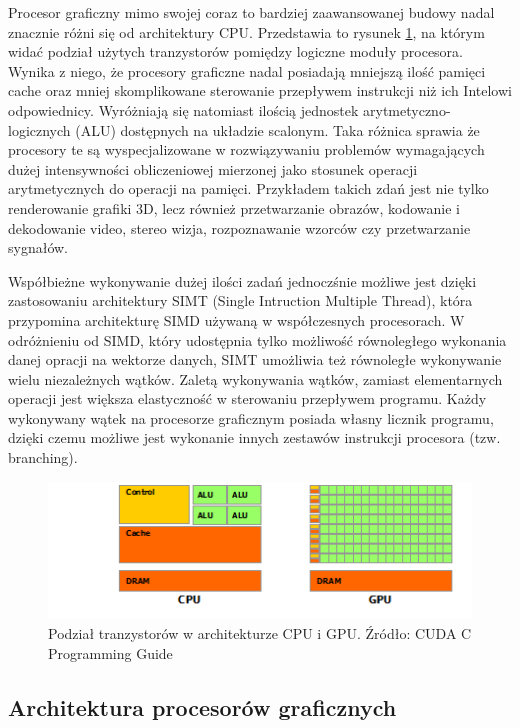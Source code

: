 Procesor graficzny mimo swojej coraz to bardziej zaawansowanej budowy nadal
znacznie różni się od architektury CPU. Przedstawia to rysunek \ref{cpugpu}, na
którym widać podział użytych tranzystorów pomiędzy logiczne moduły procesora.
Wynika z niego, że procesory graficzne nadal posiadają mniejszą ilość pamięci cache oraz
mniej skomplikowane sterowanie przepływem instrukcji niż ich Intelowi
odpowiednicy. Wyróżniają się natomiast ilością jednostek arytmetyczno-logicznych
(ALU) dostępnych na układzie scalonym. Taka różnica sprawia że procesory te są wyspecjalizowane w rozwiązywaniu
problemów wymagających dużej intensywności obliczeniowej mierzonej jako stosunek
operacji arytmetycznych do operacji na pamięci. Przykładem takich zdań jest nie tylko 
renderowanie grafiki 3D, lecz również przetwarzanie obrazów, kodowanie i
dekodowanie video, stereo wizja, rozpoznawanie wzorców czy przetwarzanie sygnałów.

Współbieżne wykonywanie dużej ilości zadań jednoczśnie możliwe jest dzięki 
zastosowaniu architektury SIMT (Single Intruction Multiple Thread), która
przypomina architekturę SIMD używaną w współczesnych procesorach. W
odróżnieniu od SIMD, który udostępnia tylko możliwość równoległego wykonania danej
opracji na wektorze danych, SIMT umożliwia też równoległe wykonywanie wielu
niezależnych wątków. Zaletą wykonywania wątków, zamiast elementarnych operacji jest większa
elastyczność w sterowaniu przepływem programu. Każdy wykonywany wątek
na procesorze graficznym posiada własny licznik programu, dzięki czemu możliwe
jest wykonanie innych zestawów instrukcji procesora (tzw. branching).

\begin{figure}[ht]
\centering
\includegraphics{images/gpu-devotes-more-transistors-to-data-processing.png}
\caption{Podział tranzystorów w architekturze CPU i GPU. Źródło: CUDA C Programming Guide}
\label{cpugpu}
\end{figure}

\subsection{Architektura procesorów graficznych}

